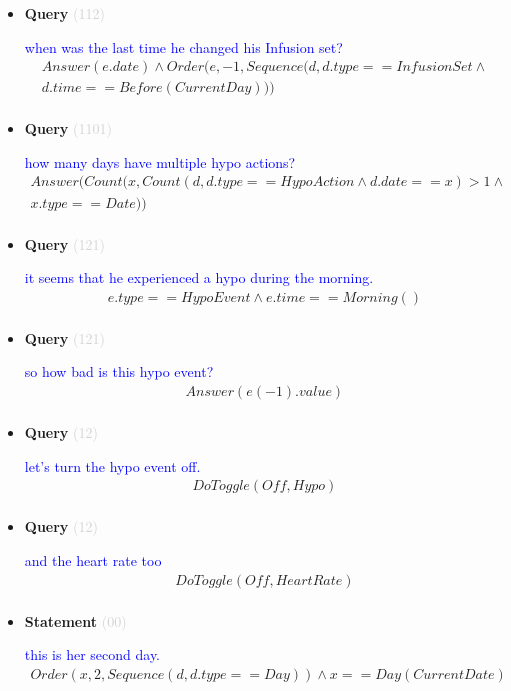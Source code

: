 \documentclass[11pt]{article}
\newcommand{\key}[1]{\textcolor{lightgray}{#1}}
\newcounter{CQuery}
\newcounter{CStatement}
\begin{document}
\begin{itemize}
\item
\textbf{Query\theCQuery} \key{(112)} \addtocounter{CQuery}{1}
\textcolor{blue}{ when was the last time he changed his Infusion set? }
\begin{multline*}
Answer(e.date) \wedge Order(e, -1, Sequence(d, d.type==InfusionSet\wedge \\ 
d.time==Before(CurrentDay))) \\ 
\end{multline*}


\item
\textbf{Query\theCQuery} \key{(1101)} \addtocounter{CQuery}{1}
\textcolor{blue}{ how many days have multiple hypo actions? }
\begin{multline*}
Answer(Count(x, Count(d, d.type==HypoAction \wedge d.date==x)>1 \wedge \\ 
x.type==Date)) \\ 
\end{multline*}


\item
\textbf{Query\theCQuery} \key{(121)} \addtocounter{CQuery}{1}
\textcolor{blue}{ it seems that he experienced a hypo during the morning. }
\begin{multline*}
e.type==HypoEvent \wedge e.time==Morning() \\ 
\end{multline*}


\item
\textbf{Query\theCQuery} \key{(121)} \addtocounter{CQuery}{1}
\textcolor{blue}{ so how bad is this hypo event? }
\begin{multline*}
Answer(e(-1).value) \\ 
\end{multline*}


\item
\textbf{Query\theCQuery} \key{(12)} \addtocounter{CQuery}{1}
\textcolor{blue}{ let's turn the hypo event off. }
\begin{multline*}
DoToggle(Off, Hypo) \\ 
\end{multline*}


\item
\textbf{Query\theCQuery} \key{(12)} \addtocounter{CQuery}{1}
\textcolor{blue}{ and the heart rate too }
\begin{multline*}
DoToggle(Off, HeartRate) \\ 
\end{multline*}


\item
\textbf{Statement\theCStatement} \key{(00)} \addtocounter{CStatement}{1}
\textcolor{blue}{ this is her second day. }
\begin{multline*}
Order(x, 2, Sequence(d, d.type==Day)) \wedge x==Day(CurrentDate) \\ 
\end{multline*}



\end{itemize}
\end{document}
